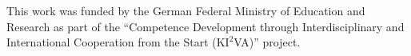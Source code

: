 \documentclass[sigconf]{acmart}
\begin{document}

\begin{acks}
This work was funded by the German Federal Ministry of Education and Research as part of the 
``Competence Development through Interdisciplinary and International Cooperation from the Start
(K$\mathrm{I^2}$VA)'' project.
\end{acks}



\end{document}
